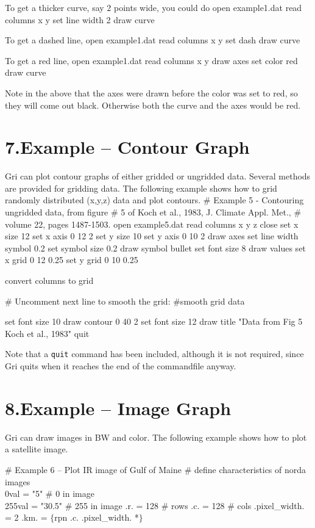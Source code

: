 To get a thicker curve, say 2 points wide, you could do
\beginexample
open example1.dat
read columns x y
set line width 2
draw curve
\endexample

\newcolumn
To get a dashed line,
\beginexample
open example1.dat
read columns x y
set dash
draw curve
\endexample

To get a red line,
\beginexample
open example1.dat
read columns x y
draw axes
set color red
draw curve
\endexample

Note in the above that the axes were drawn before the color was set to
red, so they will come out black.  Otherwise both the curve and the
axes would be red.


\section{7.\quad Example -- Contour Graph}
Gri can plot contour graphs of either gridded or ungridded data.
Several methods are provided for gridding data.  The following example
shows how to grid randomly distributed (x,y,z) data and plot contours.
\beginexample
\# Example 5 - Contouring ungridded data, from figure
\# 5 of Koch et al., 1983, J. Climate Appl. Met.,
\# volume 22, pages 1487-1503.
open example5.dat
read columns x y z
close
set x size 12
set x axis 0 12 2
set y size 10
set y axis 0 10 2
draw axes
set line width symbol 0.2
set symbol size 0.2
draw symbol bullet
set font size 8
draw values
set x grid 0 12 0.25
set y grid 0 10 0.25

convert columns to grid 

\# Uncomment next line to smooth the grid:
\#smooth grid data

set font size 10
draw contour 0 40 2
set font size 12
draw title "Data from Fig 5 Koch et al., 1983"
quit
\endexample

Note that a {\tt quit} command has been included, although it is not
required, since Gri quits when it reaches the end of the commandfile
anyway.




\section{8.\quad Example -- Image Graph} Gri can draw images in BW and color.
The following example shows how to plot a satellite image.


\beginexample
\# Example 6 -- Plot IR image of Gulf of Maine
\# define characteristics of norda images
\\0val         = "5"             \# 0 in image
\\255val       = "30.5"          \# 255 in image
.r.           = 128             \# rows
.c.           = 128             \# cols
.pixel_width. = 2
.km.          = $\lbrace$rpn .c. .pixel_width. *$\rbrace$

